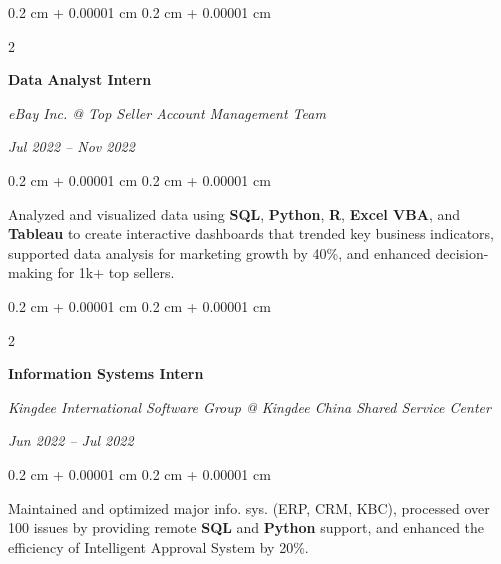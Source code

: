 \documentclass[10pt, letterpaper]{article}
\newenvironment{highlights}{
    \begin{itemize}[
        topsep=0.10 cm,
        parsep=0.10 cm,
        partopsep=0pt,
        itemsep=0pt,
        leftmargin=0.4 cm + 10pt
    ]
}{
    \end{itemize}
} %
\newenvironment{onecolentry}{
    \begin{adjustwidth}{
        0.2 cm + 0.00001 cm
    }{
        0.2 cm + 0.00001 cm
    }
}{
    \end{adjustwidth}
} %
\newenvironment{twocolentry}[2][]{
    \onecolentry
    \def\secondColumn{#2}
    \setcolumnwidth{\fill, 4.5 cm}
    \begin{paracol}{2}
}{
    \switchcolumn \raggedleft \secondColumn
    \end{paracol}
    \endonecolentry
} %
\begin{document}
        \begin{twocolentry}{
        \textit{Jul 2022 – Nov 2022}}
            \textbf{Data Analyst Intern}

            \textit{eBay Inc. @ Top Seller Account Management Team}
        \end{twocolentry}
        \begin{onecolentry}
            \begin{highlights}
                Analyzed and visualized data using \textbf{SQL}, \textbf{Python}, \textbf{R}, \textbf{Excel VBA}, and \textbf{Tableau} to create interactive dashboards that trended key business indicators, supported data analysis for marketing growth by 40\%, and enhanced decision-making for 1k+ top sellers.
            \end{highlights}
        \end{onecolentry}

        \vspace{0.2 cm}

        \begin{twocolentry}{
        \textit{Jun 2022 – Jul 2022}}
            \textbf{Information Systems Intern}

            \textit{Kingdee International Software Group @ Kingdee China Shared Service Center}
        \end{twocolentry}
        \begin{onecolentry}
            \begin{highlights}
                Maintained and optimized major info. sys. (ERP, CRM, KBC), processed over 100 issues by providing remote \textbf{SQL} and \textbf{Python} support, and enhanced the efficiency of Intelligent Approval System by 20\%.
            \end{highlights}
        \end{onecolentry}


\end{document}

